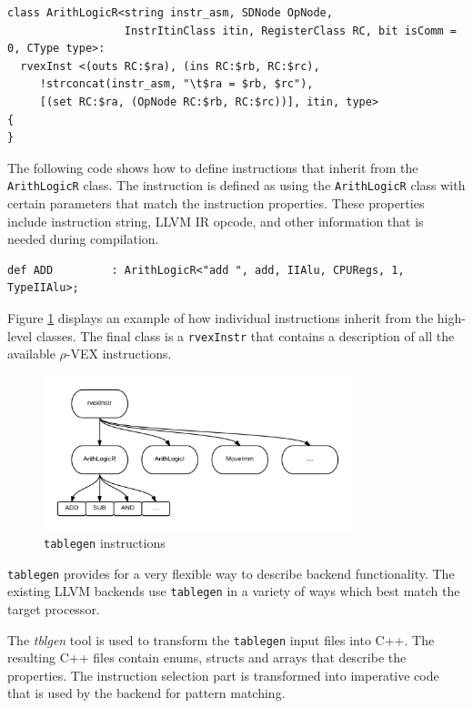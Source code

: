 \begin{lstlisting}[language=tblgen, caption={Class representing three-operand instructions}]
class ArithLogicR<string instr_asm, SDNode OpNode,
                  InstrItinClass itin, RegisterClass RC, bit isComm = 0, CType type>:
  rvexInst <(outs RC:$ra), (ins RC:$rb, RC:$rc),
     !strconcat(instr_asm, "\t$ra = $rb, $rc"),
     [(set RC:$ra, (OpNode RC:$rb, RC:$rc))], itin, type> 
{
}
\end{lstlisting}

The following code shows how to define instructions that inherit from the \texttt{ArithLogicR} class. The instruction is defined as using the \texttt{ArithLogicR} class with certain parameters that match the instruction properties. These properties include instruction string, LLVM IR opcode, and other information that is needed during compilation.

\begin{lstlisting}[language=tblgen, caption={\texttt{add} instruction}]
def ADD         : ArithLogicR<"add ", add, IIAlu, CPURegs, 1, TypeIIAlu>;
\end{lstlisting}

Figure \ref{fig:tblgen} displays an example of how individual instructions inherit from the high-level classes. The final class is a \texttt{rvexInstr} that contains a description of all the available $\rho$-VEX instructions.

\begin{figure}[ht]
\centering
\includegraphics[width=0.8\textwidth]{3_implementation/img/instr.png}
\caption{\texttt{tablegen} instructions}
\label{fig:tblgen}
\end{figure}

\texttt{tablegen} provides for a very flexible way to describe backend functionality. The existing LLVM backends use \texttt{tablegen} in a variety of ways which best match the target processor. 

The \emph{tblgen} tool is used to transform the \texttt{tablegen} input files into C++. The resulting C++ files contain enums, structs and arrays that describe the properties. The instruction selection part is transformed into imperative code that is used by the backend for pattern matching. 

